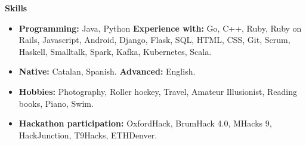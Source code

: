 \documentclass[letterpaper,10pt]{article}
\newcommand{\resitem}[1]{\item #1 \vspace{-2pt}}
\newcommand{\resheading}[1]{{\large \colorbox{mygrey}{\begin{minipage}{\textwidth}{\textbf{#1 \vphantom{p\^{E}}}}\end{minipage}}}}
\begin{document}

\resheading{Skills}
\begin{itemize}
	\resitem{\textbf{Programming:} Java, Python \textbf{Experience with:}  Go, C++, Ruby, Ruby on Rails, Javascript, Android, Django, Flask, SQL, HTML, CSS, Git, Scrum, Haskell, Smalltalk, Spark, Kafka, Kubernetes, Scala.}
	\resitem{\textbf{Native:} Catalan, Spanish. \textbf{Advanced:} English.}
	\resitem{\textbf{Hobbies:} Photography, Roller hockey, Travel, Amateur Illusionist, Reading books, Piano, Swim.}
	\resitem{\textbf{Hackathon participation:} OxfordHack, BrumHack 4.0, MHacks 9, HackJunction, T9Hacks, ETHDenver.}

\end{itemize}
\end{document}
